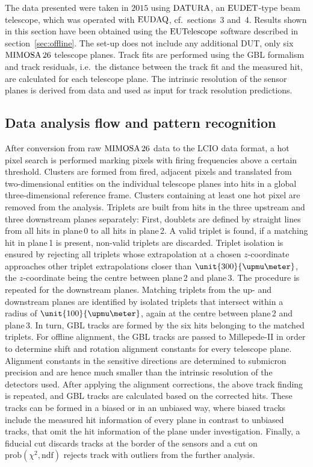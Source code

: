 
The data presented were taken in $2015$ using $\textrm{DATURA}$, an $\textrm{EUDET}$-type beam telescope, which was operated with $\textrm{EUDAQ}$, cf.~sections~3 and~4. 
Results shown in this section have been obtained using the $\textrm{EUTelescope}$ software described in section~\ref{sec:offline}. 
The set-up does not include any additional DUT, only six $\textrm{MIMOSA\,26}$ telescope planes. 
Track fits are performed using the GBL formalism and track residuals, i.e.\ the distance between the track fit and the measured hit,
 are calculated for each telescope plane. 
The intrinsic resolution of the sensor planes is derived from data and used as input for track resolution predictions. 
 

\subsection{Data analysis flow and pattern recognition}
\label{sec:datura-nodut}

After conversion from raw $\textrm{MIMOSA\,26}$ data to the LCIO data format, a hot pixel search is performed marking pixels with firing frequencies above a certain threshold.
Clusters are formed from fired, adjacent pixels and translated from two-dimensional entities on the individual telescope planes into hits in a global three-dimensional reference frame.
Clusters containing at least one hot pixel are removed from the analysis. 
Triplets are built from hits in the three upstream and three downstream planes separately: 
First, doublets are defined by straight lines from all hits in plane\,0 to all hits in plane\,2. 
A valid triplet is found, if a matching hit in plane\,1 is present, non-valid triplets are discarded.  
Triplet isolation is ensured by rejecting all triplets whose extrapolation at a chosen $z$-coordinate approaches other triplet extrapolations closer than $\unit{300}{\upmu\meter}$,
 the $z$-coordinate being the centre between plane\,2 and plane\,3. 
The procedure is repeated for the downstream planes. 
Matching triplets from the up- and downstream planes are identified by isolated triplets that intersect within a radius of $\unit{100}{\upmu\meter}$, again at the centre between plane\,2 and plane\,3. 
In turn, GBL tracks are formed by the six hits belonging to the matched triplets. 
For offline alignment, the GBL tracks are passed to \mbox{Millepede-II} in order to determine shift and rotation alignment constants for every telescope plane.
Alignment constants in the sensitive directions are determined to submicron precision and are hence much smaller than the intrinsic resolution of the detectors used. 
After applying the alignment corrections, the above track finding is repeated, and GBL tracks are calculated based on the corrected hits. 
These tracks can be formed in a \textrm{biased} or in an \textrm{unbiased} way, where biased tracks include the measured hit information of every plane in contrast to unbiased tracks,
 that omit the hit information of the plane under investigation. 
Finally, a fiducial cut discards tracks at the border of the sensors and a cut on $\textrm{prob}(\chi^2,\textrm{ndf})$ rejects track with outliers from the further analysis. 

